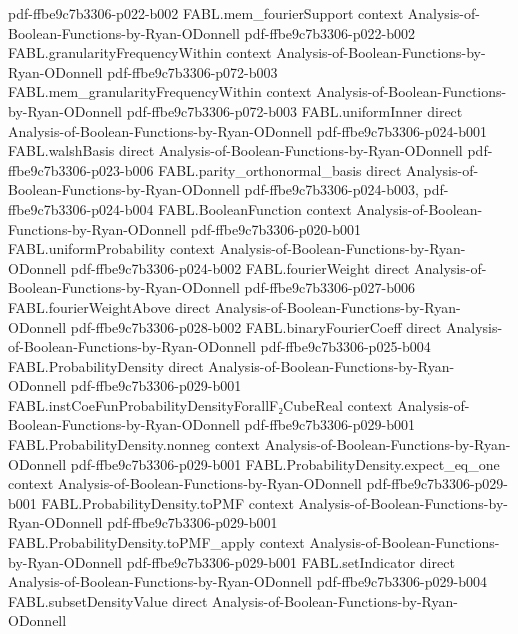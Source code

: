 \begin{theorem}
  {pdf-ffbe9c7b3306-p022-b002}
\proofstep
  {FABL.mem_fourierSupport}
  {context}
  {Analysis-of-Boolean-Functions-by-Ryan-ODonnell}
  {pdf-ffbe9c7b3306-p022-b002}
\proofstep
  {FABL.granularityFrequencyWithin}
  {context}
  {Analysis-of-Boolean-Functions-by-Ryan-ODonnell}
  {pdf-ffbe9c7b3306-p072-b003}
\proofstep
  {FABL.mem_granularityFrequencyWithin}
  {context}
  {Analysis-of-Boolean-Functions-by-Ryan-ODonnell}
  {pdf-ffbe9c7b3306-p072-b003}
\proofstep
  {FABL.uniformInner}
  {direct}
  {Analysis-of-Boolean-Functions-by-Ryan-ODonnell}
  {pdf-ffbe9c7b3306-p024-b001}
\proofstep
  {FABL.walshBasis}
  {direct}
  {Analysis-of-Boolean-Functions-by-Ryan-ODonnell}
  {pdf-ffbe9c7b3306-p023-b006}
\proofstep
  {FABL.parity_orthonormal_basis}
  {direct}
  {Analysis-of-Boolean-Functions-by-Ryan-ODonnell}
  {pdf-ffbe9c7b3306-p024-b003,
    pdf-ffbe9c7b3306-p024-b004}
\proofstep
  {FABL.BooleanFunction}
  {context}
  {Analysis-of-Boolean-Functions-by-Ryan-ODonnell}
  {pdf-ffbe9c7b3306-p020-b001}
\proofstep
  {FABL.uniformProbability}
  {context}
  {Analysis-of-Boolean-Functions-by-Ryan-ODonnell}
  {pdf-ffbe9c7b3306-p024-b002}
\proofstep
  {FABL.fourierWeight}
  {direct}
  {Analysis-of-Boolean-Functions-by-Ryan-ODonnell}
  {pdf-ffbe9c7b3306-p027-b006}
\proofstep
  {FABL.fourierWeightAbove}
  {direct}
  {Analysis-of-Boolean-Functions-by-Ryan-ODonnell}
  {pdf-ffbe9c7b3306-p028-b002}
\proofstep
  {FABL.binaryFourierCoeff}
  {direct}
  {Analysis-of-Boolean-Functions-by-Ryan-ODonnell}
  {pdf-ffbe9c7b3306-p025-b004}
\proofstep
  {FABL.ProbabilityDensity}
  {direct}
  {Analysis-of-Boolean-Functions-by-Ryan-ODonnell}
  {pdf-ffbe9c7b3306-p029-b001}
\proofstep
  {FABL.instCoeFunProbabilityDensityForallF₂CubeReal}
  {context}
  {Analysis-of-Boolean-Functions-by-Ryan-ODonnell}
  {pdf-ffbe9c7b3306-p029-b001}
\proofstep
  {FABL.ProbabilityDensity.nonneg}
  {context}
  {Analysis-of-Boolean-Functions-by-Ryan-ODonnell}
  {pdf-ffbe9c7b3306-p029-b001}
\proofstep
  {FABL.ProbabilityDensity.expect_eq_one}
  {context}
  {Analysis-of-Boolean-Functions-by-Ryan-ODonnell}
  {pdf-ffbe9c7b3306-p029-b001}
\proofstep
  {FABL.ProbabilityDensity.toPMF}
  {context}
  {Analysis-of-Boolean-Functions-by-Ryan-ODonnell}
  {pdf-ffbe9c7b3306-p029-b001}
\proofstep
  {FABL.ProbabilityDensity.toPMF_apply}
  {context}
  {Analysis-of-Boolean-Functions-by-Ryan-ODonnell}
  {pdf-ffbe9c7b3306-p029-b001}
\proofstep
  {FABL.setIndicator}
  {direct}
  {Analysis-of-Boolean-Functions-by-Ryan-ODonnell}
  {pdf-ffbe9c7b3306-p029-b004}
\proofstep
  {FABL.subsetDensityValue}
  {direct}
  {Analysis-of-Boolean-Functions-by-Ryan-ODonnell}

\end{theorem}
